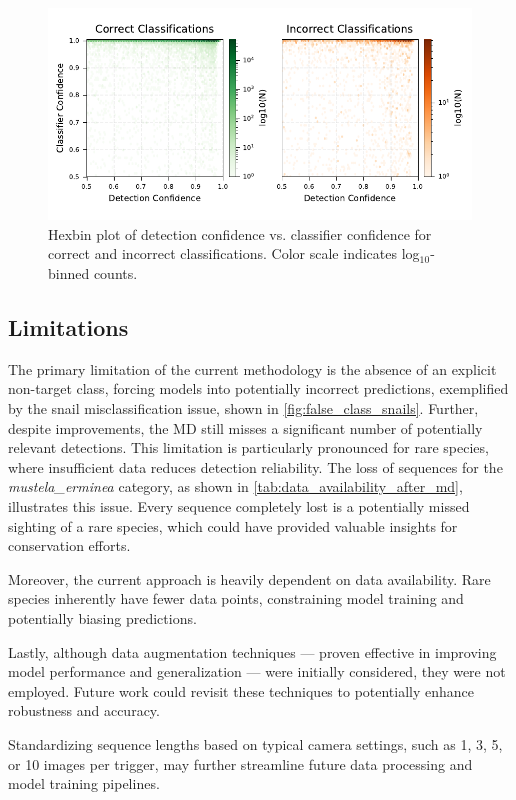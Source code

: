 \begin{figure}[ht]
\centering
\includegraphics{figures/pred_conf_hexbin.pdf}
\caption{Hexbin plot of detection confidence vs. classifier confidence for correct and incorrect classifications. Color scale indicates log$_{10}$-binned counts.}
\label{fig:pred_conf_hexbin}
\end{figure}

\subsection{Limitations}
The primary limitation of the current methodology is the absence of an explicit non-target class, forcing models into potentially incorrect predictions, exemplified by the snail misclassification issue, shown in \autoref{fig:false_class_snails}.
Further, despite improvements, the \ac{MD} still misses a significant number of potentially relevant detections.
This limitation is particularly pronounced for rare species, where insufficient data reduces detection reliability.
The loss of sequences for the \textit{mustela\_erminea} category, as shown in \autoref{tab:data_availability_after_md}, illustrates this issue.
Every sequence completely lost is a potentially missed sighting of a rare species, which could have provided valuable insights for conservation efforts.

Moreover, the current approach is heavily dependent on data availability.
Rare species inherently have fewer data points, constraining model training and potentially biasing predictions.

Lastly, although data augmentation techniques --- proven effective in improving model performance and generalization \autocite{shortenSurveyImageData2019} --- were initially considered, they were not employed.
Future work could revisit these techniques to potentially enhance robustness and accuracy.

Standardizing sequence lengths based on typical camera settings, such as 1, 3, 5, or 10 images per trigger, may further streamline future data processing and model training pipelines.
